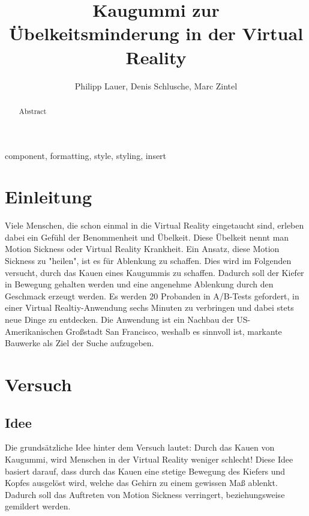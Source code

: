 \documentclass[conference]{IEEEtran}
\begin{document}
\title{Kaugummi zur Übelkeitsminderung in der Virtual Reality\\}

\author{Philipp Lauer, Denis Schlusche, Marc Zintel}

\maketitle

\begin{abstract}
Abstract
\end{abstract}

\begin{IEEEkeywords}
component, formatting, style, styling, insert
\end{IEEEkeywords}

\section{Einleitung}
Viele Menschen, die schon einmal in die Virtual Reality eingetaucht sind, erleben dabei ein Gefühl der Benommenheit und Übelkeit. Diese Übelkeit nennt man Motion Sickness oder Virtual Reality Krankheit. Ein Ansatz, diese Motion Sickness zu "heilen", ist es für Ablenkung zu schaffen. Dies wird im Folgenden versucht, durch das Kauen eines Kaugummis zu schaffen. Dadurch soll der Kiefer in Bewegung gehalten werden und eine angenehme Ablenkung durch den Geschmack erzeugt werden. Es werden 20 Probanden in A/B-Tests gefordert, in einer Virtual Realtiy-Anwendung sechs Minuten zu verbringen und dabei stets neue Dinge zu entdecken. Die Anwendung ist ein Nachbau der US-Amerikanischen Großstadt San Francisco, weshalb es sinnvoll ist, markante Bauwerke als Ziel der Suche aufzugeben. 

\section{Versuch}
\subsection{Idee}
Die grundsätzliche Idee hinter dem Versuch lautet: Durch das Kauen von Kaugummi, wird Menschen in der Virtual Reality weniger schlecht!
Diese Idee basiert darauf, dass durch das Kauen eine stetige Bewegung des Kiefers und Kopfes ausgelöst wird, welche das Gehirn zu einem gewissen Maß ablenkt. Dadurch soll das Auftreten von Motion Sickness verringert, beziehungsweise gemildert werden. 
\end{document}
